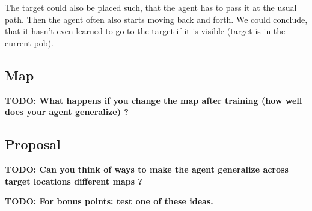 \documentclass[a4paper,14pt]{article}
\begin{document}
The target could also be placed such, that the agent has to pass it at the usual
path. Then the agent often also starts moving back and forth.
We could conclude, that it hasn't even learned to go to the target if it is
visible (target is in the current pob).

\subsection{Map}
\textbf{TODO: What happens if you change the map after training (how well does your
agent generalize) ?}
\subsection{Proposal}
\textbf{TODO: Can you think of ways to make the agent generalize across target locations
different maps ?}

\textbf{TODO: For bonus points: test one of these ideas.}

\end{document}
